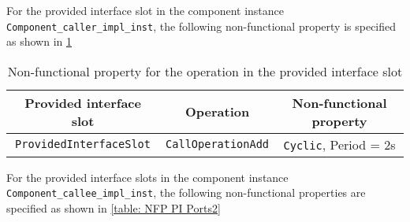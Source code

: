 \begin{description}
For the provided interface slot in the component instance \texttt{Component\allowbreak\_caller\allowbreak\_impl\_inst}, the following non-functional property is specified as shown in \cref{table: NFP PI Ports1}

\begin{table}[]
	\centering
	\caption{Non-functional property for the operation in the provided interface slot}
	\label{table: NFP PI Ports1}
	\begin{tabular}{lll}
		\hline
		\multicolumn{1}{|c|}{\textbf{Provided interface slot}} & \multicolumn{1}{c|}{\textbf{Operation}} & \multicolumn{1}{c|}{\textbf{Non-functional property}} \\ \hline
		\multicolumn{1}{|c|}{\texttt{ProvidedInterfaceSlot}} & \multicolumn{1}{c|}{\texttt{CallOperationAdd}} & \multicolumn{1}{c|}{\texttt{Cyclic}, Period = 2s} \\ \hline
	\end{tabular}
\end{table}

For the provided interface slots in the component instance \texttt{Component\allowbreak\_callee\_impl\_inst}, the following non-functional properties are specified as shown in \cref{table: NFP PI Ports2}


\end{description}
